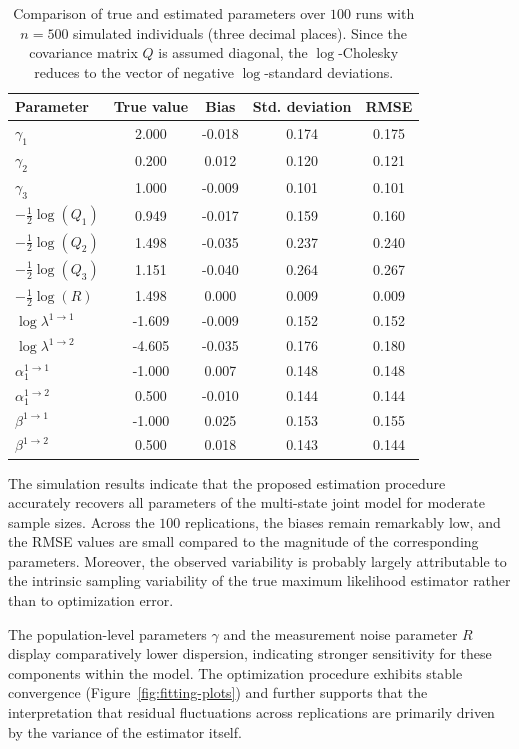 \documentclass{sn-jnl}
\begin{document}
\begin{table}[H]
    \centering
    \begin{tabular}{lcccc}
    \hline
    Parameter &True value &Bias &Std. deviation &RMSE \\
    \hline
    $\gamma_1$ &2.000 &-0.018 &0.174 &0.175 \\
    $\gamma_2$ &0.200 &0.012 &0.120 &0.121 \\
    $\gamma_3$ &1.000 &-0.009 &0.101 &0.101 \\
    $-\frac{1}{2} \log(Q_1)$ &0.949 &-0.017 &0.159 &0.160 \\
    $-\frac{1}{2} \log(Q_2)$ &1.498 &-0.035 &0.237 &0.240 \\
    $-\frac{1}{2} \log(Q_3)$ &1.151 &-0.040 &0.264 &0.267 \\
    $-\frac{1}{2} \log(R)$ &1.498 &0.000 &0.009 &0.009 \\
    $\log \lambda^{1 \to 1}$ &-1.609 &-0.009 &0.152 &0.152 \\
    $\log \lambda^{1 \to 2}$ &-4.605 &-0.035 &0.176 &0.180 \\
    $\alpha_1^{1 \to 1}$ &-1.000 &0.007 &0.148 &0.148 \\
    $\alpha_1^{1 \to 2}$ &0.500 &-0.010 &0.144 &0.144 \\
    $\beta^{1 \to 1}$ &-1.000 &0.025 &0.153 &0.155 \\
    $\beta^{1 \to 2}$ &0.500 &0.018 &0.143 &0.144 \\
    \hline
    \end{tabular}
    \bigbreak
    \caption{Comparison of true and estimated parameters over $100$ runs with $n = 500$ simulated individuals (three decimal places). Since the covariance matrix $Q$ is assumed diagonal, the $\log$-Cholesky reduces to the vector of negative $\log$-standard deviations.}
    \label{tbl:convergence-rmse}
\end{table}

The simulation results indicate that the proposed estimation procedure accurately recovers all parameters of the multi-state joint model for moderate sample sizes. Across the $100$ replications, the biases remain remarkably low, and the RMSE values are small compared to the magnitude of the corresponding parameters. Moreover, the observed variability is probably largely attributable to the intrinsic sampling variability of the true maximum likelihood estimator rather than to optimization error.

The population-level parameters $\gamma$ and the measurement noise parameter $R$ display comparatively lower dispersion, indicating stronger sensitivity for these components within the model. The optimization procedure exhibits stable convergence (Figure~\ref{fig:fitting-plots}) and further supports that the interpretation that residual fluctuations across replications are primarily driven by the variance of the estimator itself.
\end{document}
